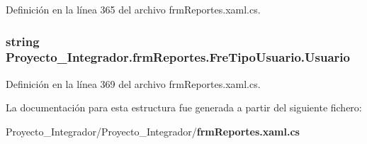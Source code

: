 Definición en la línea 365 del archivo frm\-Reportes.\-xaml.\-cs.

\subsubsection[{Usuario}]{\setlength{\rightskip}{0pt plus 5cm}string Proyecto\-\_\-\-Integrador.\-frm\-Reportes.\-Fre\-Tipo\-Usuario.\-Usuario\hspace{0.3cm}{\ttfamily [get]}}\label{struct_proyecto___integrador_1_1frm_reportes_1_1_fre_tipo_usuario_acb08ccff6beef07aa6ea9583c7626094}


Definición en la línea 369 del archivo frm\-Reportes.\-xaml.\-cs.



La documentación para esta estructura fue generada a partir del siguiente fichero\-:\begin{DoxyCompactItemize}
\item 
Proyecto\-\_\-\-Integrador/\-Proyecto\-\_\-\-Integrador/{\bf frm\-Reportes.\-xaml.\-cs}\end{DoxyCompactItemize}
